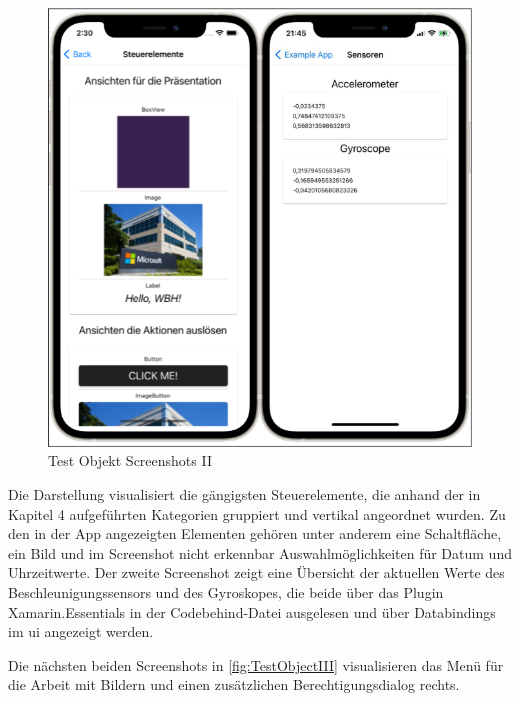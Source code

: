 \begin{figure}[!ht]
 \includegraphics[width=\textwidth,keepaspectratio]{Images/Screenshot/Sensors.png}
 \caption{Test Objekt Screenshots II}
 \label{fig:TestObjectII}
\end{figure}
Die Darstellung visualisiert die gängigsten Steuerelemente,  die anhand der in Kapitel 4 aufgeführten Kategorien gruppiert und vertikal angeordnet wurden.  Zu den in der App angezeigten Elementen gehören unter anderem eine Schaltfläche,  ein Bild und im Screenshot nicht erkennbar Auswahlmöglichkeiten für Datum und Uhrzeitwerte.  Der zweite Screenshot zeigt eine Übersicht der aktuellen Werte des Beschleunigungssensors und des Gyroskopes,  die beide über das Plugin Xamarin.Essentials in der Codebehind-Datei ausgelesen und über Databindings im \ac{ui} angezeigt werden.    

Die nächsten beiden Screenshots in \ref{fig:TestObjectIII} visualisieren das Menü für die Arbeit mit Bildern und einen zusätzlichen Berechtigungsdialog rechts.

